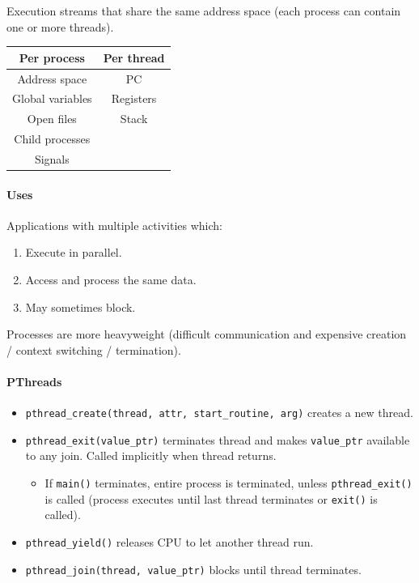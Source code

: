 \documentclass[twocolumn,english]{article}
\providecommand{\tabularnewline}{\\}
\providecommand{\tabularnewline}{\\}
\providecommand{\tabularnewline}{\\}
\begin{document}
Execution streams that share the same address space (each process
can contain one or more threads).

\begin{table}[H]
\centering{}%
\begin{tabular}{cc}
\toprule 
\textbf{Per process}  & \textbf{Per thread}\tabularnewline
\midrule 
Address space  & PC\tabularnewline
Global variables  & Registers\tabularnewline
Open files  & Stack\tabularnewline
Child processes  & \tabularnewline
Signals  & \tabularnewline
\bottomrule
\end{tabular}
\end{table}



\paragraph{Uses}

Applications with multiple activities which: 
\begin{enumerate}
\item Execute in parallel. 
\item Access and process the same data. 
\item May sometimes block. 
\end{enumerate}
Processes are more heavyweight (difficult communication and expensive
creation / context switching / termination).


\paragraph{PThreads}
\begin{itemize}
\item \texttt{pthread\_create(thread, attr, start\_routine, arg)} creates
a new thread. 
\item \texttt{pthread\_exit(value\_ptr)} terminates thread and makes \texttt{value\_ptr}
available to any join. Called implicitly when thread returns. 

\begin{itemize}
\item If \texttt{main()} terminates, entire process is terminated, unless
\texttt{pthread\_exit()} is called (process executes until last thread
terminates or \texttt{exit()} is called). 
\end{itemize}
\item \texttt{pthread\_yield()} releases CPU to let another thread run. 
\item \texttt{pthread\_join(thread, value\_ptr)} blocks until thread terminates. 
\end{itemize}
\end{document}
